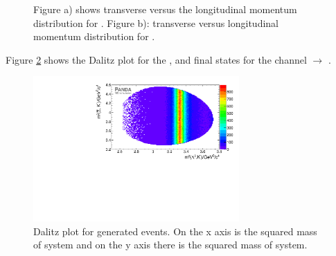 \begin{figure}
	\caption{\propose Figure a) shows transverse versus the longitudinal momentum distribution for \anticascade. Figure b):
			transverse versus longitudinal momentum distribution for \excitedcascade.}
	\label{fig:MC_xi_pt_vs_pz}
\end{figure}

Figure \ref{fig:eventgeneration_Dalitz} shows the Dalitz plot for the \lam, \kminus and \anticascade final states for 
the channel \pbarpSystem $\rightarrow$ \excitedcascade \anticascade. 

\begin{figure}
	\centering
	\includegraphics[width=0.7\textwidth]{./plots/Dalitzplot_MC.pdf}
	\caption{\propose \anticascade\lam\kminus Dalitz plot for generated events. On the x axis is the squared mass of \lam\kminus system and on the y axis there is the squared mass of \anticascade\kminus system.}
	\label{fig:eventgeneration_Dalitz}
\end{figure}

